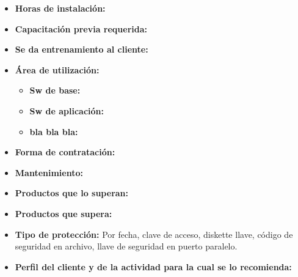 \begin{itemize}
    \item \textbf{Horas de instalación:}
    \item \textbf{Capacitación previa requerida:}
    \item \textbf{Se da entrenamiento al cliente:}

    \item \textbf{Área de utilización:}
      \begin{itemize}
        \item \textbf{Sw de base:}
        \item \textbf{Sw de aplicación:}
        \item \textbf{bla bla bla:}
      \end{itemize}

    \item \textbf{Forma de contratación:}
    \item \textbf{Mantenimiento:}
    \item \textbf{Productos que lo superan:}
    \item \textbf{Productos que supera:}
    \item \textbf{Tipo de protección:} Por fecha, clave de acceso, diskette llave, código de seguridad en archivo, llave de     seguridad en puerto paralelo.
    \item \textbf{Perfil del cliente y de la actividad para la cual se lo recomienda:}
\end{itemize}